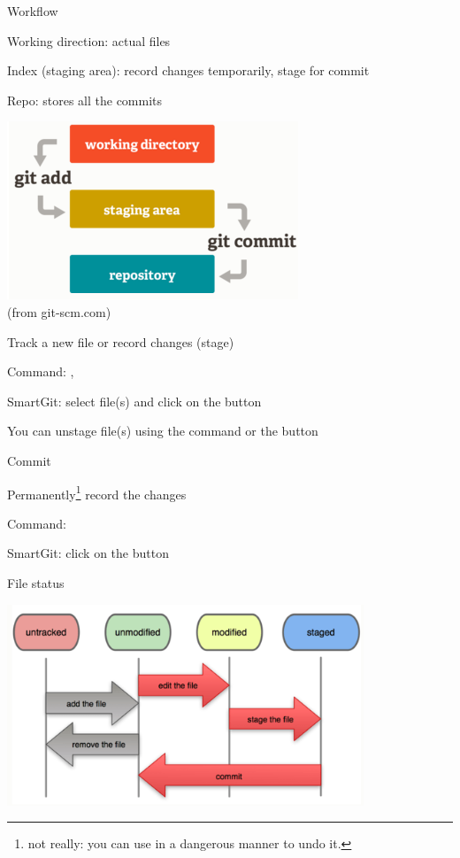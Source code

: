 \documentclass[hyperref,compress,handout,9pt,usepdftitle=false]{beamer}
\begin{document}
\begin{frame}{Workflow}
\begin{witemize}
\item Working direction: actual files
\item Index (staging area): record changes temporarily, stage for commit
\item Repo: stores all the commits
\end{witemize}
\begin{center}
  \includegraphics[width=.4\textwidth]{workflow}\\(from git-scm.com)
\end{center}
\end{frame}

\begin{frame}{Track a new file or record changes (stage)}
\begin{witemize}
\item Command: , 
\item SmartGit: select file(s) and click on the  button
\item You can unstage file(s) using the  command or the  button
\end{witemize}
\end{frame}

\begin{frame}{Commit}
\begin{witemize}
\item Permanently\footnote{not really: you can use  in a dangerous manner to undo it.} record the changes
\item Command: 
\item SmartGit: click on the  button
\end{witemize}
\end{frame}

\begin{frame}{File status}
\begin{center}
  \includegraphics[width=0.8\textwidth]{filestatus}
\end{center}
\end{frame}
\end{document}
